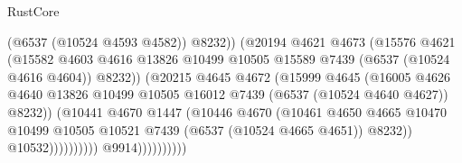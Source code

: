 \begin{lexlean}{RustCore}
\begin{coremodule}
                                          (@6537 (@10524 @4593 @4582))
                                          @8232))
                                      (@20194
                                        @4621
                                        @4673
                                        (@15576
                                          @4621
                                          (@15582
                                            @4603
                                            @4616
                                            @13826
                                            @10499
                                            @10505
                                            @15589
                                            @7439
                                            (@6537 (@10524 @4616 @4604))
                                            @8232))
                                        (@20215
                                          @4645
                                          @4672
                                          (@15999
                                            @4645
                                            (@16005
                                              @4626
                                              @4640
                                              @13826
                                              @10499
                                              @10505
                                              @16012
                                              @7439
                                              (@6537 (@10524 @4640 @4627))
                                              @8232))
                                          (@10441
                                            @4670
                                            @1447
                                            (@10446
                                              @4670
                                              (@10461
                                                @4650
                                                @4665
                                                @10470
                                                @10499
                                                @10505
                                                @10521
                                                @7439
                                                (@6537 (@10524 @4665 @4651))
                                                @8232))
                                            @10532))))))))))
                        @9914))))))))))

\end{coremodule}
\end{lexlean}

